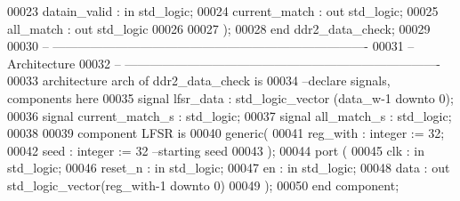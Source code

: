 \begin{DoxyCode}
00023         \textcolor{vhdlchar}{datain_valid}    \textcolor{vhdlchar}{:} \textcolor{keywordflow}{in} \textcolor{comment}{std\_logic};
00024         \textcolor{vhdlchar}{current_match}   \textcolor{vhdlchar}{:} \textcolor{keywordflow}{out} \textcolor{comment}{std\_logic};
00025         \textcolor{vhdlchar}{all_match}       \textcolor{vhdlchar}{:} \textcolor{keywordflow}{out} \textcolor{comment}{std\_logic} 
00026 
00027         \textcolor{vhdlchar}{)};
00028 \textcolor{keywordflow}{end} \textcolor{vhdlchar}{ddr2\_data\_check};
00029 
00030 \textcolor{keyword}{-- ----------------------------------------------------------------------------}
00031 \textcolor{keyword}{-- Architecture}
00032 \textcolor{keyword}{-- ----------------------------------------------------------------------------}
00033 \textcolor{keywordflow}{architecture} arch \textcolor{keywordflow}{of} ddr2_data_check is
00034 \textcolor{keyword}{--declare signals,  components here}
00035 \textcolor{keywordflow}{signal} \textcolor{vhdlchar}{lfsr_data}            \textcolor{vhdlchar}{:} \textcolor{comment}{std\_logic\_vector} \textcolor{vhdlchar}{(}\textcolor{vhdlchar}{data_w}\textcolor{vhdlchar}{-}\textcolor{vhdllogic}{}\textcolor{vhdllogic}{1} \textcolor{keywordflow}{downto} \textcolor{vhdllogic}{}\textcolor{vhdllogic}{0}\textcolor{vhdlchar}{)};
00036 \textcolor{keywordflow}{signal} \textcolor{vhdlchar}{current_match_s}  \textcolor{vhdlchar}{:} \textcolor{comment}{std\_logic};
00037 \textcolor{keywordflow}{signal} \textcolor{vhdlchar}{all_match_s}      \textcolor{vhdlchar}{:} \textcolor{comment}{std\_logic}; 
00038 
00039 \textcolor{keywordflow}{component} LFSR \textcolor{keywordflow}{is}
00040     \textcolor{keywordflow}{generic}(
00041             reg_with    : \textcolor{comment}{integer} := \textcolor{vhdllogic}{}\textcolor{vhdllogic}{32};
00042             seed        : \textcolor{comment}{integer} := \textcolor{vhdllogic}{}\textcolor{vhdllogic}{32}\textcolor{keyword}{ --starting seed}
00043 );
00044     \textcolor{keywordflow}{port} (
00045       clk           : \textcolor{keywordflow}{in} \textcolor{comment}{std\_logic};
00046       reset_n       : \textcolor{keywordflow}{in} \textcolor{comment}{std\_logic};
00047         en              : \textcolor{keywordflow}{in} \textcolor{comment}{std\_logic};
00048         data            : \textcolor{keywordflow}{out} \textcolor{comment}{std\_logic\_vector}(reg_with\textcolor{vhdlchar}{-}\textcolor{vhdllogic}{}\textcolor{vhdllogic}{1} \textcolor{keywordflow}{downto} \textcolor{vhdllogic}{}\textcolor{vhdllogic}{0})     
00049         );
00050 \textcolor{keywordflow}{end} \textcolor{keywordflow}{component};

\end{DoxyCode}
